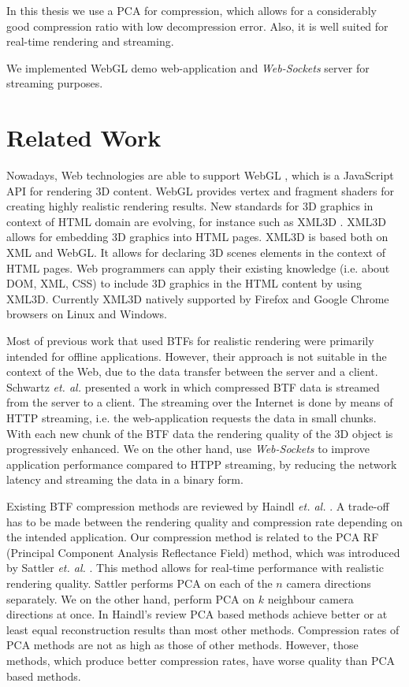 In this thesis we use a PCA for compression, which allows for a considerably good compression ratio with low decompression error.
Also, it is well suited for real-time rendering and streaming.

We implemented WebGL demo web-application and \emph{Web-Sockets} server for streaming purposes.



\section{Related Work}
\label{section:related_work}

Nowadays, Web technologies are able to support WebGL \cite{webgl}, which is a JavaScript API for rendering 3D content.
WebGL provides  vertex and fragment shaders  for creating highly realistic rendering results.
New standards for 3D graphics in context of HTML domain are evolving, for instance such as XML3D \cite{xml3d}.
XML3D allows for embedding 3D graphics into HTML pages. XML3D is based both on XML and WebGL.
It allows for declaring 3D scenes elements in the context of HTML pages.
Web programmers can apply their existing knowledge (i.e. about DOM, XML, CSS) to include 3D graphics in the HTML content by using XML3D.
Currently XML3D  natively supported by  Firefox and Google Chrome browsers on Linux and Windows.
 
Most of previous work that used BTFs for realistic rendering were primarily intended  for offline applications.
However, their approach is not suitable in the context of the Web, due to the data transfer between the server and a client.
  Schwartz \emph{et. al.} \cite{webglbtfstreaming} presented a work in which compressed BTF data is streamed from the server to a client.
 The streaming over the Internet is done by means of HTTP streaming, i.e. the web-application requests the data in small chunks.
 With each new chunk of the BTF data the rendering quality of the 3D object is progressively enhanced.
 We on the other hand, use \emph{Web-Sockets} to improve application performance compared to HTPP streaming, by reducing the network latency and streaming the data in a binary form.

 
Existing BTF compression methods are reviewed by Haindl \emph{et. al.} \cite{haindl, haindl_visual}.
A trade-off has to be made between the rendering quality and compression rate depending on the intended application.
 Our compression method is related to the PCA RF (Principal Component Analysis Reflectance Field) method, which was introduced by Sattler \emph{et. al.} \cite{star2004}.
This method allows for real-time performance with realistic rendering quality. 
Sattler performs PCA on each of the $n$ camera directions separately. We on the other hand, perform PCA on $k$ neighbour camera directions at once.
In Haindl's review \cite{haindl} PCA based methods achieve better or at least equal reconstruction results than most other methods.
Compression rates of PCA methods are not as high as those of other methods. However, those methods, which produce better compression rates, have worse quality than PCA based methods.



